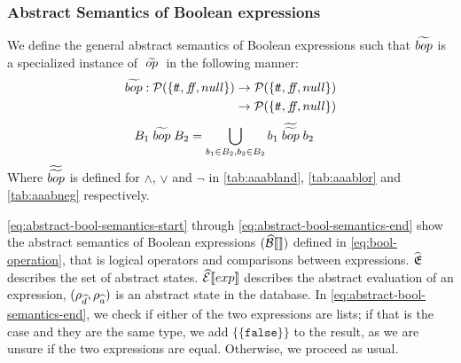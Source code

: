 \subsubsection{Abstract Semantics of Boolean expressions}
We define the general abstract semantics of Boolean expressions such that $\widetilde{bop}$ is a specialized instance of $\;\widetilde{op}\;$ in the following manner:
\begin{align}
    \begin{split}
        \aab{bop} : \mathcal{P}(\{\true, \false, null\}) &\rightarrow \mathcal{P}(\{\true, \false, null\}) \\
        &\rightarrow \mathcal{P}(\{\true, \false, null\})
    \end{split}
\end{align}
\begin{align}
    B_1 \;\widetilde{bop}\; B_2 &= \bigcup_{b_1 \in B_2, b_2 \in B_2} b_1 \;\widetilde{\widetilde{bop}}\; b_2
\end{align}
Where $\widetilde{\widetilde{bop}}$ is defined for $\land$, $\lor$ and $\neg$ in \autoref{tab:aaabland}, \autoref{tab:aaablor} and \autoref{tab:aaabneg} respectively.

\autoref{eq:abstract-bool-semantics-start} through \ref{eq:abstract-bool-semantics-end} show the abstract semantics of Boolean expressions $(\widehat{\mathcal{B}}\llbracket  \rrbracket)$ defined in \autoref{eq:bool-operation}, that is logical operators and comparisons between expressions.
$\widehat{\mathfrak{E}}$ describes the set of abstract states. $\widehat{\mathcal{E}}\llbracket exp \rrbracket$ describes the abstract evaluation of an expression, $(\rho_{\widehat{d}}, \rho_{\widehat{a}})$ is an abstract state in the database.
In \autoref{eq:abstract-bool-semantics-end}, we check if either of the two expressions are lists; if that is the case and they are the same type, we add $\{\{\texttt{false}\}\}$ to the result, as we are unsure if the two expressions are equal.
Otherwise, we proceed as usual.

